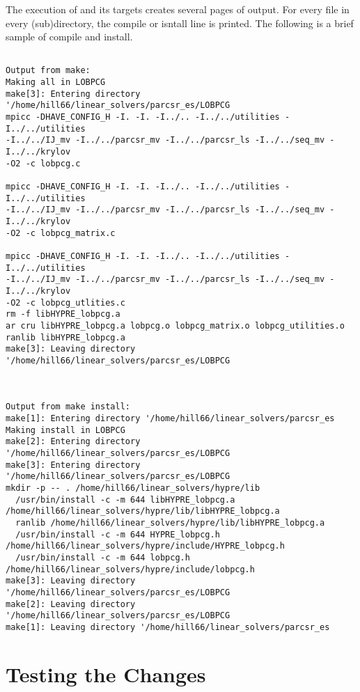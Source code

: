 The execution of  and its targets creates several pages of output.  
For every file in every (sub)directory, the compile or isntall line is printed.
The following is a brief sample of compile and install.
\begin{verbatim}

Output from make:
Making all in LOBPCG
make[3]: Entering directory '/home/hill66/linear_solvers/parcsr_es/LOBPCG
mpicc -DHAVE_CONFIG_H -I. -I. -I../.. -I../../utilities -I../../utilities 
-I../../IJ_mv -I../../parcsr_mv -I../../parcsr_ls -I../../seq_mv -I../../krylov
-O2 -c lobpcg.c

mpicc -DHAVE_CONFIG_H -I. -I. -I../.. -I../../utilities -I../../utilities 
-I../../IJ_mv -I../../parcsr_mv -I../../parcsr_ls -I../../seq_mv -I../../krylov
-O2 -c lobpcg_matrix.c

mpicc -DHAVE_CONFIG_H -I. -I. -I../.. -I../../utilities -I../../utilities 
-I../../IJ_mv -I../../parcsr_mv -I../../parcsr_ls -I../../seq_mv -I../../krylov
-O2 -c lobpcg_utlities.c
rm -f libHYPRE_lobpcg.a
ar cru libHYPRE_lobpcg.a lobpcg.o lobpcg_matrix.o lobpcg_utilities.o
ranlib libHYPRE_lobpcg.a
make[3]: Leaving directory '/home/hill66/linear_solvers/parcsr_es/LOBPCG
 


Output from make install:
make[1]: Entering directory '/home/hill66/linear_solvers/parcsr_es
Making install in LOBPCG
make[2]: Entering directory '/home/hill66/linear_solvers/parcsr_es/LOBPCG
make[3]: Entering directory '/home/hill66/linear_solvers/parcsr_es/LOBPCG
mkdir -p -- . /home/hill66/linear_solvers/hypre/lib
  /usr/bin/install -c -m 644 libHYPRE_lobpcg.a /home/hill66/linear_solvers/hypre/lib/libHYPRE_lobpcg.a
  ranlib /home/hill66/linear_solvers/hypre/lib/libHYPRE_lobpcg.a
  /usr/bin/install -c -m 644 HYPRE_lobpcg.h /home/hill66/linear_solvers/hypre/include/HYPRE_lobpcg.h
  /usr/bin/install -c -m 644 lobpcg.h /home/hill66/linear_solvers/hypre/include/lobpcg.h
make[3]: Leaving directory '/home/hill66/linear_solvers/parcsr_es/LOBPCG
make[2]: Leaving directory '/home/hill66/linear_solvers/parcsr_es/LOBPCG
make[1]: Leaving directory '/home/hill66/linear_solvers/parcsr_es

\end{verbatim}

\section{Testing the Changes}
\label{Testing the Changes}

